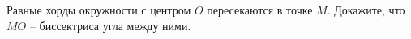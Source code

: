 \begin{ex}
	\begin{condition}
		Равные хорды окружности с центром \( O  \) пересекаются в точке \( M  \). Докажите, что \( MO \) – биссектриса угла между ними.
	\end{condition}
\end{ex}